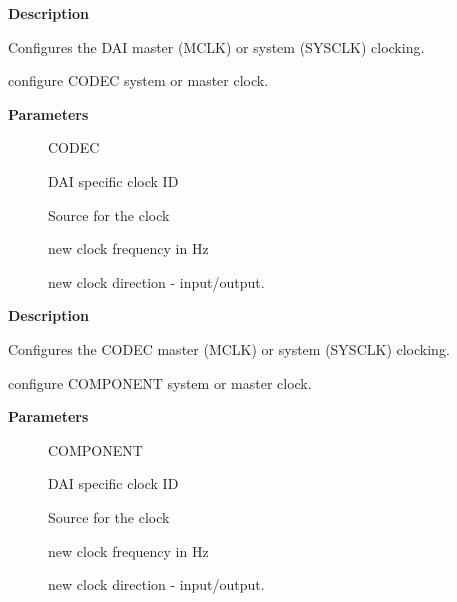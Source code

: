 \documentclass[a4paper,8pt,english]{sphinxmanual}
\begin{document}
\textbf{Description}

Configures the DAI master (MCLK) or system (SYSCLK) clocking.

\begin{fulllineitems}
\label{sound/kernel-api/alsa-driver-api:c.snd_soc_codec_set_sysclk}
configure CODEC system or master clock.

\end{fulllineitems}


\textbf{Parameters}
\begin{description}
\item[{}] \leavevmode
CODEC

\item[{}] \leavevmode
DAI specific clock ID

\item[{}] \leavevmode
Source for the clock

\item[{}] \leavevmode
new clock frequency in Hz

\item[{}] \leavevmode
new clock direction - input/output.

\end{description}

\textbf{Description}

Configures the CODEC master (MCLK) or system (SYSCLK) clocking.

\begin{fulllineitems}
\label{sound/kernel-api/alsa-driver-api:c.snd_soc_component_set_sysclk}
configure COMPONENT system or master clock.

\end{fulllineitems}


\textbf{Parameters}
\begin{description}
\item[{}] \leavevmode
COMPONENT

\item[{}] \leavevmode
DAI specific clock ID

\item[{}] \leavevmode
Source for the clock

\item[{}] \leavevmode
new clock frequency in Hz

\item[{}] \leavevmode
new clock direction - input/output.

\end{description}
\end{document}

